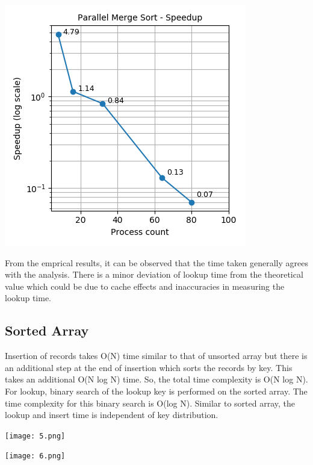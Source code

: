 \documentclass[11pt,a4paper,oneside]{article}
\begin{document}
	\begin{center}
		\includegraphics[scale=0.6]{4.png}		
	\end{center}

    From the emprical results, it can be observed that the time taken generally agrees with the analysis. There is a minor deviation of lookup time from the theoretical value which could be due to cache effects and inaccuracies in measuring the lookup time.
	
	\subsection{Sorted Array}
	Insertion of records takes O(N) time similar to that of unsorted array but there is an additional step at the end of insertion which sorts the records by key. This takes an additional O(N log N) time. So, the total time complexity is O(N log N). \\
	\newline
	For lookup, binary search of the lookup key is performed on the sorted array. The time complexity for this binary search is O(log N). Similar to sorted array, the lookup and insert time is independent of key distribution. 
	
	\begin{center}
		\texttt{[image: 5.png]}		
	\end{center}
	
	\begin{center}
		\texttt{[image: 6.png]}		
	\end{center}
     
\end{document}
